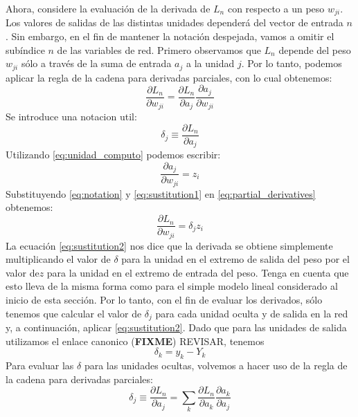 \documentclass[a4paper,11pt,spanish]{book}
\newcommand*{\FIXME}[1]{{(\textbf{FIXME}) {#1}}}
\begin{document}
	Ahora, considere la evaluación de la derivada de $L_n$ con respecto a un peso $w_{ji}$. Los valores de salidas de las distintas unidades dependerá del vector de entrada $n$.
	Sin embargo, en el fin de mantener la notación despejada, vamos a omitir el subíndice $n$ de las variables de red. Primero observamos que $L_n$ depende del peso $w_{ji}$
	sólo a través de la suma de entrada $a_j$ a la unidad $j$. Por lo tanto, podemos aplicar la regla de la cadena para derivadas parciales, con lo cual obtenemos:
	\begin{equation} \label{eq:partial_derivatives}
	  \frac{\partial L_n}{\partial w_{ji}} = \frac{\partial L_n}{\partial a_j} \frac{\partial a_j}{\partial w_{ji}}
	\end{equation}
	Se introduce una notacion util:
	\begin{equation} \label{eq:notation}
	  \delta_j \equiv \frac{\partial L_n}{\partial a_j}
	\end{equation}
	Utilizando \eqref{eq:unidad_computo} podemos escribir:
	\begin{equation} \label{eq:sustitution1}
	  \frac{\partial a_j}{\partial w_{ji}} = z_i
	\end{equation}
	Substituyendo \eqref{eq:notation} y \eqref{eq:sustitution1} en \eqref{eq:partial_derivatives} obtenemos:
	\begin{equation} \label{eq:sustitution2}
	  \frac{\partial L_n}{\partial w_{ji}} = \delta_j z_i
	\end{equation}
	La ecuación \eqref{eq:sustitution2} nos dice que la derivada se obtiene simplemente multiplicando el valor de $\delta$ para la unidad en el extremo de salida del peso
	por el valor de$z$ para la unidad en el extremo de entrada del peso. Tenga en cuenta que esto lleva de la misma forma como para el simple modelo lineal considerado al inicio de esta sección.
	Por lo tanto, con el fin de evaluar los derivados, sólo tenemos que calcular el valor de $\delta_j$ para cada unidad oculta y de salida  en la red y, a continuación, aplicar \eqref{eq:sustitution2}.
	Dado que para las unidades de salida  utilizamos el enlace canonico \FIXME{REVISAR}, tenemos
	\begin{equation} \label{eq:delta_salida}
	  \delta_k = y_k - Y_k
	\end{equation}
	Para evaluar las $\delta$ para las unidades ocultas, volvemos a hacer uso de la regla de la cadena para derivadas parciales:
	\begin{equation}\label{eq:chain_rule}
	  \delta_j \equiv \frac{\partial L_n}{\partial a_j} = \sum_k \frac{\partial L_n}{\partial a_k} \frac{\partial a_k}{\partial a_j}
	\end{equation}
	
\end{document}
